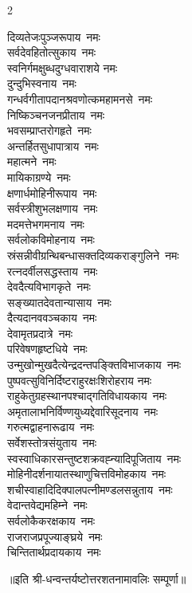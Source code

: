\begin{multicols}{2}
\begin{flushleft}
दिव्यतेजःपुञ्जरूपाय~नमः\\
सर्वदेवहितोत्सुकाय~नमः\\
स्वनिर्गमक्षुब्धदुग्धवाराशये नमः\\
दुन्दुभिस्वनाय~नमः\\
गन्धर्वगीतापदानश्रवणोत्क\-महामनसे~नमः\\
निष्किञ्चनजनप्रीताय~नमः\hfill{}\\
भवसम्प्राप्तरोगहृते~नमः\\
अन्तर्हितसुधापात्राय~नमः\\
महात्मने~नमः\\
मायिकाग्रण्ये~नमः\\
क्षणार्धमोहिनीरूपाय~नमः\\
सर्वस्त्रीशुभलक्षणाय~नमः\\
मदमत्तेभगमनाय~नमः\\
सर्वलोकविमोहनाय~नमः\\
स्रंसन्नीवीग्रन्थिबन्धासक्त\-दिव्यकराङ्गुलिने~नमः\\
रत्नदर्वीलसद्धस्ताय~नमः\hfill{}\\
देवदैत्यविभागकृते~नमः\\
सङ्ख्यातदेवतान्यासाय~नमः\\
दैत्यदानववञ्चकाय~नमः\\
देवामृतप्रदात्रे~नमः\\
परिवेषणहृष्टधिये~नमः\\
उन्मुखोन्मुखदैत्येन्द्रदन्त\-पङ्क्तिविभाजकाय~नमः\\
पुष्पवत्सुविनिर्दिष्टराहुरक्षः\-शिरोहराय नमः\\
राहुकेतुग्रहस्थानपश्चाद्गति\-विधायकाय~नमः\\
अमृतालाभनिर्विण्ण\-युध्यद्देवारि\-सूदनाय~नमः\\
गरुत्मद्वाहनारूढाय~नमः\hfill{}\\
सर्वेशस्तोत्रसंयुताय~नमः\\
स्वस्वाधिकारसन्तुष्ट\-शक्रवह्न्यादिपूजिताय~नमः\\
मोहिनीदर्शनायात\-स्थाणुचित्तविमोहकाय~नमः\\
शचीस्वाहादिदिक्पालपत्नी\-मण्डलसन्नुताय~नमः\\
वेदान्तवेद्यमहिम्ने~नमः\\
सर्वलोकैकरक्षकाय~नमः\\
राजराजप्रपूज्याङ्घ्रये~नमः\\
चिन्तितार्थप्रदायकाय~नमः\hfill{}\\
\end{flushleft}
\end{multicols}
॥इति श्री-धन्वन्तर्यष्टोत्तरशतनामावलिः सम्पूर्णा॥
